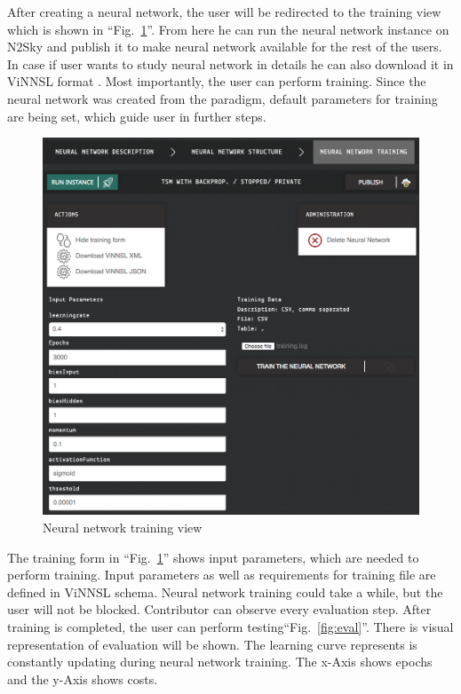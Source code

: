 \documentclass[conference]{IEEEtran}
\begin{document}
After creating a neural network, the user will be redirected to the training view which is shown in ``Fig.~\ref{fig:training}''. From here he can run the neural network instance on N2Sky and publish it to make neural network available for the rest of the users. In case if user wants to study neural network in details he can also download it in ViNNSL format . Most importantly, the user can perform training. Since the neural network was created from the paradigm, default parameters for training are being set, which guide user in further steps.


\begin{figure}[H]
  \includegraphics[width=\linewidth]{training.png}
  \caption{Neural network training view}
  \label{fig:training}
\end{figure}

The training form in  ``Fig.~\ref{fig:training}'' shows input parameters, which are needed to perform training. Input parameters as well as requirements for training file are defined in ViNNSL schema. 
Neural network training could take a while, but the user will not be blocked. Contributor can observe every evaluation step. After training is completed, the user can perform testing``Fig.~\ref{fig:eval}''. There is visual representation of evaluation will be shown.  The learning curve represents is constantly updating during neural network training. The x-Axis shows epochs and the y-Axis shows costs. 
\end{document}
